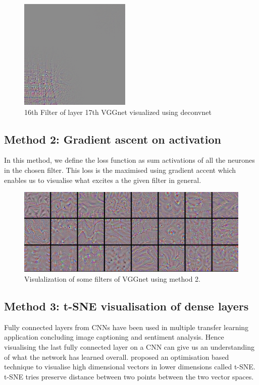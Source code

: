 \documentclass{article} %
\begin{document}
\begin{figure}[h]
  \begin{center}
  \includegraphics[width=200]{dnet_out.png}
  \end{center}
  \caption{16th Filter of layer 17th VGGnet visualized using deconvnet}
\end{figure}

\subsection{Method 2: Gradient ascent on activation}
In this method, we define the loss function as sum activations of all the
neurones in the chosen filter. This loss is the maximised using
gradient accent which enables us to visualise what excites a the given filter
in general.

\begin{figure}[h]
  \begin{center}
  \includegraphics[width=\linewidth]{ga_out.png}
  \end{center}
  \caption{Visulalization of some filters of VGGnet using method 2.}
\end{figure}


\subsection{Method 3: t-SNE visualisation of dense layers}
Fully connected layers from CNNs have been used in multiple transfer learning
application concluding image captioning and sentiment analysis. Hence visualising
the last fully connected layer on a CNN can give us an understanding of what the network
has learned overall. \citet{maaten2008visualizing} proposed an optimisation
based technique to visualise high dimensional vectors in lower dimensions called
t-SNE. t-SNE tries preserve distance between two points between the two vector
spaces.
\end{document}
